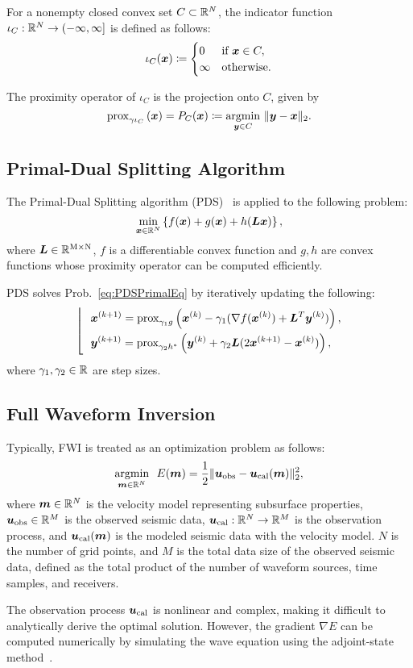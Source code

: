For a nonempty closed convex set $C \subset \mathbb{R}^N$, the indicator function $\iota_C: \mathbb{R}^N \to (- \infty, \infty] $ is defined as follows:
\begin{equation} \label{eq:IndicatorFunctionDefinitionEq} \indicatorFunctionDefinition \end{equation}

The proximity operator of $\iota_C$ is the projection onto $C$, given by
\begin{equation} \label{eq:ProximityOperatorDefinitionWithIndicatorFunctionEq}
\proximityOperator{ \gamma \iota_{C} }{\vecx} = P_C(\vecx) \coloneq \argmin{\vecy \in C} \ \LTwoNorm{\vecy - \vecx}.
\end{equation}



\subsection{Primal-Dual Splitting Algorithm} \label{subsec:primal-dual-splitting-algorithm}

The Primal-Dual Splitting algorithm (PDS)~\cite{PDS0,PDS1,PDS2,PDS3} is applied to the following problem:
\begin{equation} \label{eq:PDSPrimalEq} \PDSPrimal, \end{equation}
where $\bm{L} \in \mathbb{R}^{\mathrm{M} \times \mathrm{N}}$, $f$ is a differentiable convex function and $g,h$ are convex functions whose proximity operator can be computed efficiently.

PDS solves Prob.~\eqref{eq:PDSPrimalEq} by iteratively updating the following:
\begin{equation} \label{eq:PDSSubStep} \PDSSubStep \end{equation}
where $\gamma_1, \gamma_2 \in \mathbb{R}$ are step sizes.


\subsection{Full Waveform Inversion} \label{subsec:full-waveform-inversion}

Typically, FWI is treated as an optimization problem as follows\cite{FWI0}:
\begin{equation} \label{eq:FWIObjective} \argmin{\velModel \in \realNumber^N} \ \ \FWIObjectiveDefinition, \end{equation}
where $\bm{m} \in \mathbb{R}^{N}$ is the velocity model representing subsurface properties, $\bm{u}_{\mathrm{obs}} \in \mathbb{R}^{M}$ is the observed seismic data, $\bm{u}_{\mathrm{cal}} : \mathbb{R}^{N} \rightarrow \mathbb{R}^{M}$ is the observation process, and $\bm{u}_{\mathrm{cal}}(\bm{m})$ is the modeled seismic data with the velocity model.
$N$ is the number of grid points, and $M$ is the total data size of the observed seismic data, defined as the total product of the number of waveform sources, time samples, and receivers.

The observation process $\bm{u}_{\mathrm{cal}}$ is nonlinear and complex, making it difficult to analytically derive the optimal solution.
However, the gradient $\nabla E$ can be computed numerically by simulating the wave equation using the adjoint-state method~\cite{FWI-gradient}.
